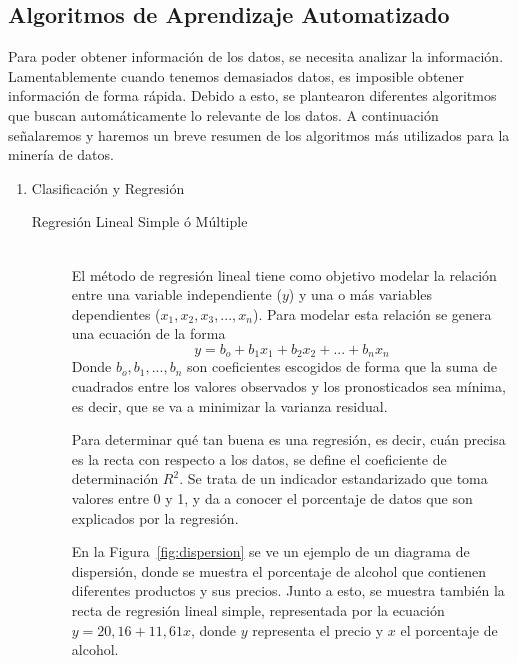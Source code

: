 \subsection{Algoritmos de Aprendizaje Automatizado}
Para poder obtener información de los datos, se necesita analizar la información. Lamentablemente cuando tenemos demasiados datos, es imposible obtener información de forma rápida. Debido a esto, se plantearon diferentes algoritmos que buscan automáticamente lo relevante de los datos.
A continuación señalaremos y haremos un breve resumen de los algoritmos más utilizados para la minería de datos.


\begin{enumerate}
  \item Clasificación y Regresión
    \begin{description}
      \item[Regresión Lineal Simple ó Múltiple] \hfill \\
      El método de regresión lineal tiene como objetivo modelar la relación entre una variable independiente ($y$) y una o más variables dependientes ($x_1, x_2, x_3,...,x_n$). Para modelar esta relación se genera una ecuación de la forma 
      \begin{equation}\label{rlineal}
      y= b_o + b_1 x_1 + b_2 x_2 + ... + b_n x_n 
      \end{equation}
      Donde $b_o,b_1,...,b_n$ son coeficientes escogidos de forma que la suma de cuadrados entre los valores observados y los pronosticados sea mínima, es decir, que se va a minimizar la varianza residual.
      
      Para determinar qué tan buena es una regresión, es decir, cuán precisa es la recta con respecto a los datos, se define el coeficiente de determinación $R^2$. Se trata de un indicador estandarizado que toma valores entre 0 y 1, y da a conocer el porcentaje de datos que son explicados por la regresión. 
      
      En la Figura~\ref{fig:dispersion} se ve un ejemplo de un diagrama de dispersión, donde se muestra el porcentaje de alcohol que contienen diferentes productos y sus precios. Junto a esto, se muestra también la recta de regresión lineal simple, representada por la ecuación $y=20,16+11,61x$, donde $y$ representa el precio y $x$ el porcentaje de alcohol. 
      

\end{description}
\end{enumerate}

